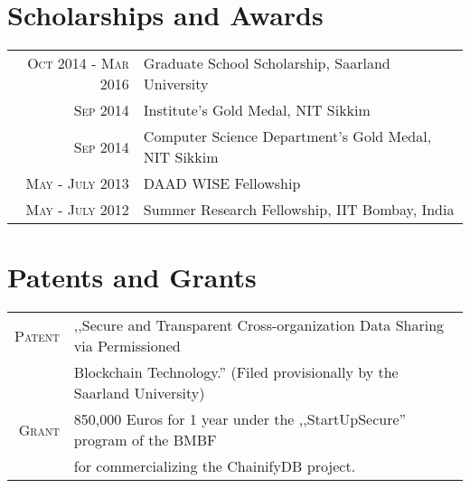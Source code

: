 \documentclass[a4paper,10pt]{article} %
\begin{document}
\section{Scholarships and Awards}

\begin{tabular}{rl}
\textsc{Oct 2014 - Mar 2016} & Graduate School Scholarship, Saarland University\\
\textsc{Sep 2014} & Institute's Gold Medal, NIT Sikkim\\
\textsc{Sep 2014} & Computer Science Department's Gold Medal, NIT Sikkim\\
\textsc{May - July 2013} & DAAD WISE Fellowship\\
\textsc{May - July 2012} & Summer Research Fellowship, IIT Bombay, India\\
\end{tabular}


\section{Patents and Grants}

\begin{tabular}{rl}
\textsc{Patent} & ,,Secure and Transparent Cross-organization Data Sharing via Permissioned\\
&Blockchain Technology.'' (Filed provisionally by the Saarland University)\\
\textsc{Grant} & 850,000 Euros for 1 year under the ,,StartUpSecure'' program of the BMBF\\
& for commercializing the ChainifyDB project.
\end{tabular}

\renewcommand\refname{Publications}
\setlength\bibitemsep{\baselineskip}


\nocite{*}

\end{document}

